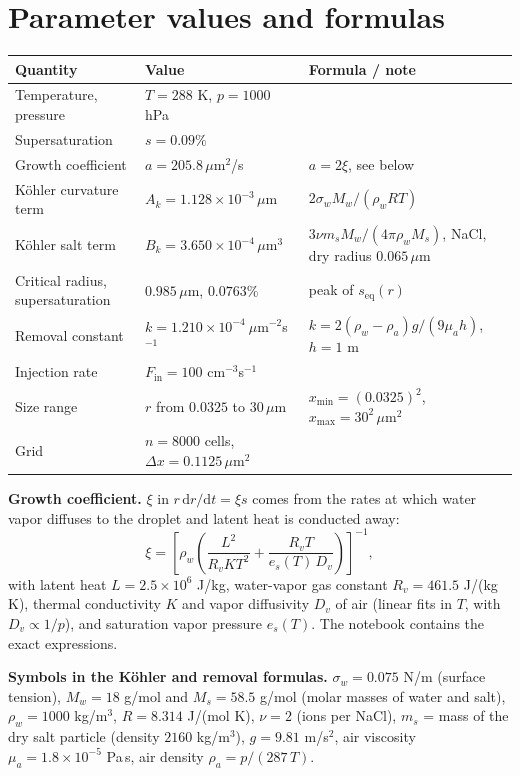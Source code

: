 \documentclass[11pt]{article}
\newcommand{\um}{\,\mu\mathrm{m}}
\newcommand{\Fin}{F_{\mathrm{in}}}
\newcommand{\seq}{s_{\mathrm{eq}}}
\newcommand{\dd}{\mathrm{d}}
\begin{document}
\appendix
\section{Parameter values and formulas}\label{app:params}
\begin{center}\small
\begin{tabular}{@{}>{\raggedright\arraybackslash}p{4.0cm}>{\raggedright\arraybackslash}p{4.4cm}>{\raggedright\arraybackslash}p{7.0cm}@{}}
\toprule
Quantity & Value & Formula / note\\\midrule
Temperature, pressure & $T = 288$ K, $p = 1000$ hPa & \\
Supersaturation & $s = 0.09\%$ & \\
Growth coefficient & $a = 205.8\um^2$/s & $a = 2\xi$, see below\\
Köhler curvature term & $A_k = 1.128\times10^{-3}\um$ & $2\sigma_w M_w/(\rho_w R T)$\\
Köhler salt term & $B_k = 3.650\times10^{-4}\um^3$ & $3\nu m_s M_w/(4\pi\rho_w M_s)$, NaCl, dry radius $0.065\um$\\
Critical radius, supersaturation & $0.985\um$, $0.0763\%$ & peak of $\seq(r)$\\
Removal constant & $k = 1.210\times10^{-4}\ \mu$m$^{-2}$s$^{-1}$ & $k = 2(\rho_w - \rho_a)g/(9\mu_a h)$, $h = 1$ m\\
Injection rate & $\Fin = 100$ cm$^{-3}$s$^{-1}$ & \\
Size range & $r$ from $0.0325$ to $30\um$ & $x_{\min} = (0.0325)^2$, $x_{\max} = 30^2\um^2$\\
Grid & $n = 8000$ cells, $\Delta x = 0.1125\um^2$ & \\\bottomrule
\end{tabular}
\end{center}

\noindent\textbf{Growth coefficient.} $\xi$ in $r\,\dd r/\dd t = \xi s$ comes from the rates at which water vapor diffuses to the droplet and latent heat is conducted away:
\[
\xi = \left[\rho_w\left(\frac{L^2}{R_v K T^2} + \frac{R_v T}{e_s(T)\,D_v}\right)\right]^{-1},
\]
with latent heat $L = 2.5\times10^6$ J/kg, water-vapor gas constant $R_v = 461.5$ J/(kg K), thermal conductivity $K$ and vapor diffusivity $D_v$ of air (linear fits in $T$, with $D_v\propto1/p$), and saturation vapor pressure $e_s(T)$. The notebook contains the exact expressions.

\noindent\textbf{Symbols in the Köhler and removal formulas.} $\sigma_w = 0.075$ N/m (surface tension), $M_w = 18$ g/mol and $M_s = 58.5$ g/mol (molar masses of water and salt), $\rho_w = 1000$ kg/m$^3$, $R = 8.314$ J/(mol K), $\nu = 2$ (ions per NaCl), $m_s$ = mass of the dry salt particle (density $2160$ kg/m$^3$), $g = 9.81$ m/s$^2$, air viscosity $\mu_a = 1.8\times10^{-5}$ Pa\,s, air density $\rho_a = p/(287\,T)$.
\end{document}
